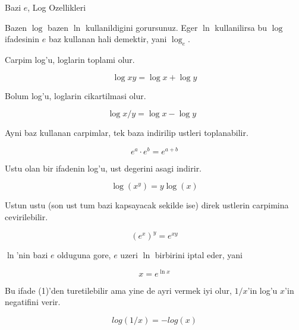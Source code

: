 \documentclass[12pt,fleqn]{article}\usepackage{../common}
\begin{document}
Bazi $e$, Log Ozellikleri

Bazen $\log$ bazen $\ln$ kullanildigini gorursunuz. Eger $\ln$
kullanilirsa bu $\log$ ifadesinin $e$ baz kullanan hali demektir, yani
$\log_e$. 

Carpim log'u, loglarin toplami olur.

\[ \log xy = \log x + \log y \]

Bolum log'u, loglarin cikartilmasi olur.

\[ \log x/y = \log x - \log y  \ \ \ \label{1}\]

Ayni baz kullanan carpimlar, tek baza indirilip ustleri toplanabilir.

\[ e^a \cdot e^b = e^{a+b} \]

Ustu olan bir ifadenin log'u, ust degerini asagi indirir.

\[ \log(x^y) = y \log(x) \]

Ustun ustu (son ust tum bazi kapsayacak sekilde ise) direk ustlerin
carpimina cevirilebilir.

\[ (e^x)^y = e^{xy} \]

$\ln$'nin bazi $e$ olduguna gore, $e$ uzeri $\ln$ birbirini iptal eder,
yani

\[ x = e^{\ln x} \]

Bu ifade (1)'den turetilebilir ama yine de ayri vermek iyi olur, $1/x$'in
log'u $x$'in negatifini verir. 

\[ log(1/x) = -log(x) \]
\end{document}

